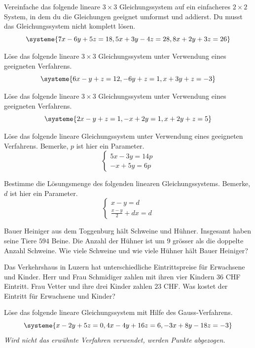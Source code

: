 \documentclass[11pt]{exam}
\begin{document}
\begin{questions}
\question[5] %
Vereinfache das folgende lineare $3\times3$ Gleichungssystem auf ein einfacheres $2\times2$ System, in dem du die Gleichungen geeignet umformst und addierst. Du musst das Gleichungssystem nicht komplett lösen.
\[\systeme{7x-6y+5z=18,5x+3y-4z=28,8x+2y+3z=26}\]


\question[4]
Löse das folgende lineare $3\times3$ Gleichungssystem unter Verwendung eines geeigneten Verfahrens. \[\systeme{6x-y+z=12,-6y+z=1,x+3y+z=-3}\]


\question[4]
Löse das folgende lineare $3\times3$ Gleichungssystem unter Verwendung eines geeigneten Verfahrens. \[\systeme{2x-y+z=1,-x+2y=1,x+2y+z=5}\]

\question[4] %
Löse das folgende lineare Gleichungssystem unter Verwendung eines geeigneten Verfahrens. Bemerke, $p$ ist hier ein Parameter. \[\left\{\begin{matrix}5x-3y=14p\\-x+5y=6p\end{matrix}\right.\]


\question[4] %
Bestimme die Lösungsmenge des folgenden linearen Gleichungssystems. Bemerke, $d$ ist hier ein Parameter.
\[\left\{\begin{matrix}x-y=d\\\frac{x-y}{2}+dx=d\end{matrix}\right.\]

\question[6] %
Bauer Heiniger aus dem Toggenburg hält Schweine und Hühner. Insgesamt haben seine Tiere $594$ Beine. Die Anzahl der Hühner ist um $9$ grösser als die doppelte Anzahl Schweine. Wie viele Schweine und wie viele Hühner hält Bauer Heiniger?


\question[5] %
Das Verkehrshaus in Luzern hat unterschiedliche Eintrittspreise für Erwachsene und Kinder. Herr und Frau Schmidiger zahlen mit ihren vier Kindern $36$ CHF Eintritt. Frau Vetter und ihre drei Kinder zahlen $23$ CHF. Was kostet der Eintritt für Erwachsene und Kinder?

\question[5] %
Löse das folgende lineare Gleichungssystem mit Hilfe des Gauss-Verfahrens.
\[\systeme{x-2y+5z=0,4x-4y+16z=6,-3x+8y-18z=-3}\]
\textit{Wird nicht das erwähnte Verfahren verwendet, werden Punkte abgezogen.}


\end{questions}
\end{document}
